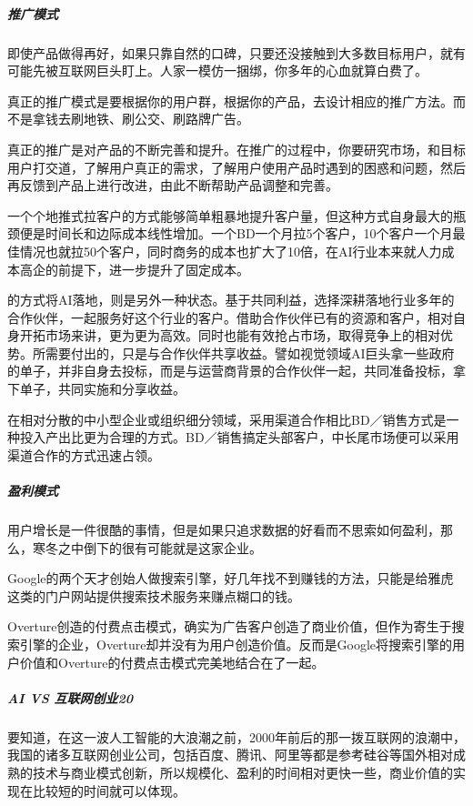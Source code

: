 \documentclass[letterpaper,10pt,english]{sphinxmanual}
\begin{document}
\subparagraph{推广模式}
\label{\detokenize{chapter_idea/business:id11}}
即使产品做得再好，如果只靠自然的口碑，只要还没接触到大多数目标用户，就有可能先被互联网巨头盯上。人家一模仿一捆绑，你多年的心血就算白费了。

真正的推广模式是要根据你的用户群，根据你的产品，去设计相应的推广方法。而不是拿钱去刷地铁、刷公交、刷路牌广告。

真正的推广是对产品的不断完善和提升。在推广的过程中，你要研究市场，和目标用户打交道，了解用户真正的需求，了解用户使用产品时遇到的困惑和问题，然后再反馈到产品上进行改进，由此不断帮助产品调整和完善。

一个个地推式拉客户的方式能够简单粗暴地提升客户量，但这种方式自身最大的瓶颈便是时间长和边际成本线性增加。一个BD一个月拉5个客户，10个客户一个月最佳情况也就拉50个客户，同时商务的成本也扩大了10倍，在AI行业本来就人力成本高企的前提下，进一步提升了固定成本。

的方式将AI落地，则是另外一种状态。基于共同利益，选择深耕落地行业多年的合作伙伴，一起服务好这个行业的客户。借助合作伙伴已有的资源和客户，相对自身开拓市场来讲，更为更为高效。同时也能有效抢占市场，取得竞争上的相对优势。所需要付出的，只是与合作伙伴共享收益。譬如视觉领域AI巨头拿一些政府的单子，并非自身去投标，而是与运营商背景的合作伙伴一起，共同准备投标，拿下单子，共同实施和分享收益。

在相对分散的中小型企业或组织细分领域，采用渠道合作相比BD／销售方式是一种投入产出比更为合理的方式。BD／销售搞定头部客户，中长尾市场便可以采用渠道合作的方式迅速占领。%
\begin{footnote}[404]\sphinxAtStartFootnote
{}
%
\end{footnote}


\subparagraph{盈利模式}
\label{\detokenize{chapter_idea/business:id12}}
用户增长是一件很酷的事情，但是如果只追求数据的好看而不思索如何盈利，那么，寒冬之中倒下的很有可能就是这家企业。

Google的两个天才创始人做搜索引擎，好几年找不到赚钱的方法，只能是给雅虎这类的门户网站提供搜索技术服务来赚点糊口的钱。

Overture创造的付费点击模式，确实为广告客户创造了商业价值，但作为寄生于搜索引擎的企业，Overture却并没有为用户创造价值。反而是Google将搜索引擎的用户价值和Overture的付费点击模式完美地结合在了一起。


\subparagraph{AI VS 互联网创业20\sphinxfootnotemark[405]}
\label{\detokenize{chapter_idea/business:ai-vs-20}}%
\begin{footnotetext}[405]\sphinxAtStartFootnote
{}
%
\end{footnotetext}\ignorespaces 
要知道，在这一波人工智能的大浪潮之前，2000年前后的那一拨互联网的浪潮中，我国的诸多互联网创业公司，包括百度、腾讯、阿里等都是参考硅谷等国外相对成熟的技术与商业模式创新，所以规模化、盈利的时间相对更快一些，商业价值的实现在比较短的时间就可以体现。
\end{document}
